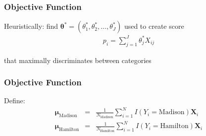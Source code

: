 \documentclass{beamer}
\numberwithin{equation}{section}
\begin{document}
\begin{frame}
\frametitle{Objective Function}


\alert{Heuristically}: find $\boldsymbol{\theta}^{*} = (\theta_{1}^{*}, \theta_{2}^{*}, \hdots, \theta_{J}^{*}) $ used to create score
\begin{eqnarray}
p_{i}  = \sum_{j=1}^{J} \theta_{j}^{*} X_{ij} \nonumber
\end{eqnarray}

 that maximally discriminates between categories






\end{frame}




\begin{frame}
\frametitle{Objective Function}



Define:
\begin{eqnarray}
\boldsymbol{\mu}_{\text{Madison}} & = & \frac{1}{N_{\text{Madison}}} \sum_{i=1}^{N} I(Y_{i} = \text{Madison}) \boldsymbol{X}_{i} \nonumber \\
\boldsymbol{\mu}_{\text{Hamilton}} & = & \frac{1}{N_{\text{Hamilton}}} \sum_{i=1}^{N} I(Y_{i} = \text{Hamilton}) \boldsymbol{X}_{i} \nonumber
\end{eqnarray}









\end{frame}
\end{document}
